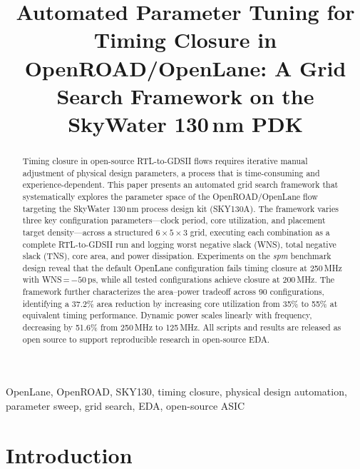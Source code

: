 \documentclass[conference]{IEEEtran}
\begin{document}
\title{Automated Parameter Tuning for Timing Closure in
OpenROAD/OpenLane: A Grid Search Framework
on the SkyWater 130\,nm PDK}

\author{
}

\maketitle

\begin{abstract}
Timing closure in open-source RTL-to-GDSII flows requires iterative
manual adjustment of physical design parameters, a process that is
time-consuming and experience-dependent. This paper presents an
automated grid search framework that systematically explores the
parameter space of the OpenROAD/OpenLane flow targeting the SkyWater
130\,nm process design kit (SKY130A). The framework varies three key
configuration parameters---clock period, core utilization, and
placement target density---across a structured $6\times5\times3$ grid,
executing each combination as a complete RTL-to-GDSII run and logging
worst negative slack (WNS), total negative slack (TNS), core area, and
power dissipation. Experiments on the \textit{spm} benchmark design
reveal that the default OpenLane configuration fails timing closure at
250\,MHz with WNS\,=\,$-50$\,ps, while all tested configurations
achieve closure at 200\,MHz. The framework further characterizes the
area--power tradeoff across 90 configurations, identifying a 37.2\%
area reduction by increasing core utilization from 35\% to 55\% at
equivalent timing performance. Dynamic power scales linearly with
frequency, decreasing by 51.6\% from 250\,MHz to 125\,MHz. All
scripts and results are released as open source to support reproducible
research in open-source EDA.
\end{abstract}

\begin{IEEEkeywords}
OpenLane, OpenROAD, SKY130, timing closure, physical design
automation, parameter sweep, grid search, EDA, open-source ASIC
\end{IEEEkeywords}

\section{Introduction}
\end{document}
